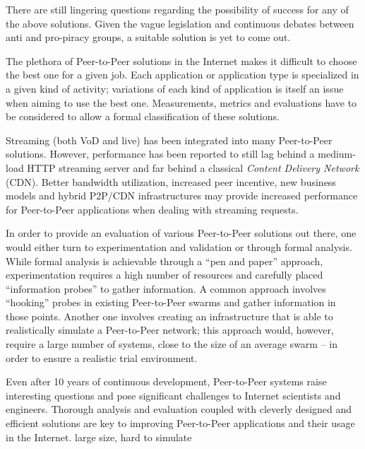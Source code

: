 There are still lingering questions regarding the possibility of success for
any of the above solutions. Given the vague legislation and continuous debates
between anti and pro-piracy groups, a suitable solution is yet to come out.

The plethora of Peer-to-Peer solutions in the Internet makes it difficult to
choose the best one for a given job. Each application or application type is
specialized in a given kind of activity; variations of each kind of
application is itself an issue when aiming to use the best one. Measurements,
metrics and evaluations have to be considered to allow a formal classification
of these solutions.

Streaming (both VoD and live) has been integrated into many Peer-to-Peer
solutions.  However, performance has been reported to still lag behind a
medium-load HTTP streaming server and far behind a classical \textit{Content
Delivery Network} (CDN). Better bandwidth utilization, increased peer
incentive, new business models and hybrid P2P/CDN infrastructures may provide
increased performance for Peer-to-Peer applications when dealing with
streaming requests.

In order to provide an evaluation of various Peer-to-Peer solutions out there,
one would either turn to experimentation and validation or through formal
analysis. While formal analysis is achievable through a ``pen and paper''
approach, experimentation requires a high number of resources and carefully
placed ``information probes'' to gather information. A common approach
involves ``hooking'' probes in existing Peer-to-Peer swarms and gather
information in those points. Another one involves creating an infrastructure
that is able to realistically simulate a Peer-to-Peer network; this approach
would, however, require a large number of systems, close to the size of an
average swarm -- in order to ensure a realistic trial environment.

Even after 10 years of continuous development, Peer-to-Peer systems raise
interesting questions and pose significant challenges to Internet scientists
and engineers. Thorough analysis and evaluation coupled with cleverly
designed and efficient solutions are key to improving Peer-to-Peer
applications and their usage in the Internet.
large size, hard to simulate
